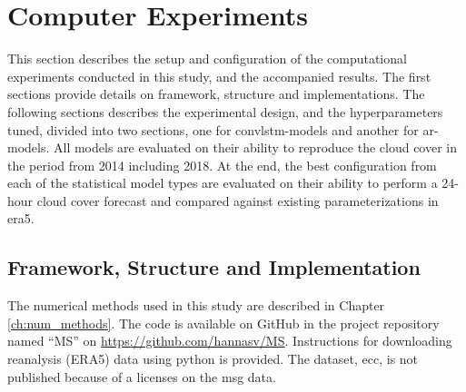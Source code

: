 \section{Computer Experiments} \label{ch:computer_experiments}
This section describes the setup and configuration of the computational experiments conducted in this study, and the accompanied results. The first sections provide details on framework, structure and implementations. The following sections describes the experimental design, and the hyperparameters tuned, 
divided into two sections, one for \acrshort{convlstm}-models and another for \acrshort{ar}-models. All models are evaluated on their ability to reproduce the cloud cover in the period from 2014 including 2018. At the end, the best configuration from each of the statistical model types are evaluated on their ability to perform a 24-hour cloud cover forecast and compared against existing parameterizations in \acrshort{era5}.

\subsection{Framework, Structure and Implementation} \label{sec:structure_and_implementations} \label{sec:framework}
The numerical methods used in this study are described in Chapter \ref{ch:num_methods}. The code is available on GitHub in the project repository named ``MS'' on \href{https://github.com/hannasv/MS}{https://github.com/hannasv/MS}. Instructions for downloading 
reanalysis (ERA5) data using python is provided. 
The dataset, \acrshort{ecc}, is not published because of a licenses on the \acrshort{msg} data. 

